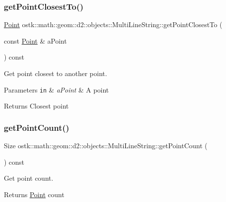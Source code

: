 \subsubsection{\texorpdfstring{get\+Point\+Closest\+To()}{getPointClosestTo()}}
{\footnotesize\ttfamily \hyperlink{classostk_1_1math_1_1geom_1_1d2_1_1objects_1_1_point}{Point} ostk\+::math\+::geom\+::d2\+::objects\+::\+Multi\+Line\+String\+::get\+Point\+Closest\+To (\begin{DoxyParamCaption}\item[{const \hyperlink{classostk_1_1math_1_1geom_1_1d2_1_1objects_1_1_point}{Point} \&}]{a\+Point }\end{DoxyParamCaption}) const}



Get point closest to another point. 


\begin{DoxyParams}[1]{Parameters}
\mbox{\tt in}  & {\em a\+Point} & A point \\
\hline
\end{DoxyParams}
\begin{DoxyReturn}{Returns}
Closest point 
\end{DoxyReturn}
\mbox{\label{classostk_1_1math_1_1geom_1_1d2_1_1objects_1_1_multi_line_string_a79be04f2c6bddfa1689b6eefba45fc83}} 
\subsubsection{\texorpdfstring{get\+Point\+Count()}{getPointCount()}}
{\footnotesize\ttfamily Size ostk\+::math\+::geom\+::d2\+::objects\+::\+Multi\+Line\+String\+::get\+Point\+Count (\begin{DoxyParamCaption}{ }\end{DoxyParamCaption}) const}



Get point count. 

\begin{DoxyReturn}{Returns}
\hyperlink{classostk_1_1math_1_1geom_1_1d2_1_1objects_1_1_point}{Point} count 
\end{DoxyReturn}
\mbox{\label{classostk_1_1math_1_1geom_1_1d2_1_1objects_1_1_multi_line_string_a446d9d1344336d6ec8b2ff1e46629ca2}} 
